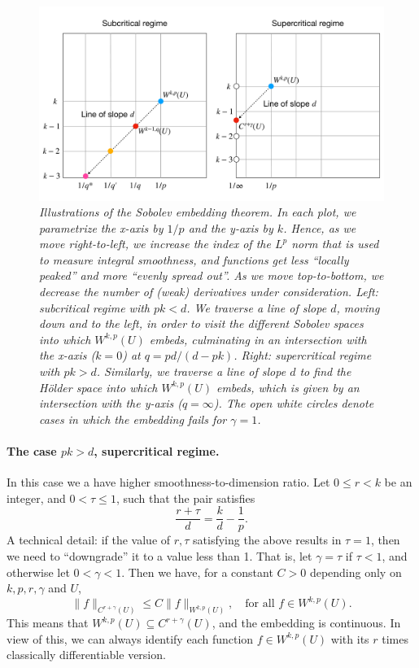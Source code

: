 \documentclass{article}
\begin{document}
\begin{figure}[tb]
\centering
\includegraphics[width=\textwidth]{sobolev.pdf}
\caption{\it Illustrations of the Sobolev embedding theorem. In each plot, we 
  parametrize the x-axis by $1/p$ and the y-axis by $k$. Hence, as we move
  right-to-left, we increase the index of the $L^p$ norm that is used to measure 
  integral smoothness, and functions get less ``locally peaked'' and more 
  ``evenly spread out''. As we move top-to-bottom, we decrease the number of
  (weak) derivatives under consideration. Left: subcritical regime with $pk <
  d$. We traverse a line of slope $d$, moving down and to the left, in order to
  visit the different Sobolev spaces into which $W^{k,p}(U)$ embeds, culminating
  in an intersection with the x-axis ($k=0$) at $q = pd/(d-pk)$. Right:
  supercritical regime with $pk > d$. Similarly, we traverse a line of slope $d$
  to find the H{\"o}lder space into which $W^{k,p}(U)$ embeds, which is given by
  an intersection with the y-axis ($q = \infty$). The open white circles denote
  cases in which the embedding fails for $\gamma = 1$.}  
\label{fig:sobolev}
\end{figure}

\paragraph{The case $pk > d$, supercritical regime.}

In this case we a have higher smoothness-to-dimension ratio. Let $0 \leq r < k$
be an integer, and $0 < \tau \leq 1$, such that the pair satisfies 
\[
\frac{r+\tau}{d} = \frac{k}{d} - \frac{1}{p}.
\]
A technical detail: if the value of $r,\tau$ satisfying the above results in
$\tau = 1$, then we need to ``downgrade'' it to a value less than 1. That is,
let $\gamma = \tau$ if $\tau < 1$, and otherwise let $0 < \gamma < 1$. Then we
have, for a constant $C>0$ depending only on $k,p,r,\gamma$ and $U$,       
\[
\|f\|_{C^{r+\gamma}(U)} \leq C \|f\|_{W^{k,p}(U)}, \quad \text{for all $f \in
  W^{k,p}(U)$}. 
\]
This means that $W^{k,p}(U) \subseteq C^{r+\gamma}(U)$, and the embedding is
continuous. In view of this, we can always identify each function $f \in
W^{k,p}(U)$ with its $r$ times classically differentiable version.     
\end{document}
